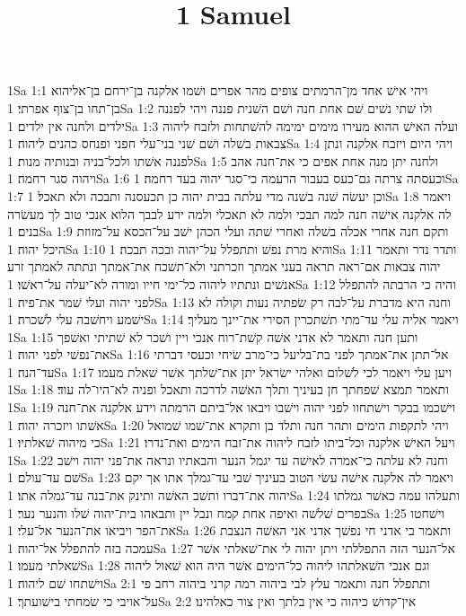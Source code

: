 

\title{1 Samuel}

1Sa 1:1  ויהי אישׁ אחד מן־הרמתים צופים מהר אפרים ושׁמו אלקנה בן־ירחם בן־אליהוא בן־תחו בן־צוף אפרתי׃
1Sa 1:2  ולו שׁתי נשׁים שׁם אחת חנה ושׁם השׁנית פננה ויהי לפננה ילדים ולחנה אין ילדים׃
1Sa 1:3  ועלה האישׁ ההוא מעירו מימים ימימה להשׁתחות ולזבח ליהוה צבאות בשׁלה ושׁם שׁני בני־עלי חפני ופנחס כהנים ליהוה׃
1Sa 1:4  ויהי היום ויזבח אלקנה ונתן לפננה אשׁתו ולכל־בניה ובנותיה מנות׃
1Sa 1:5  ולחנה יתן מנה אחת אפים כי את־חנה אהב ויהוה סגר רחמה׃
1Sa 1:6  וכעסתה צרתה גם־כעס בעבור הרעמה כי־סגר יהוה בעד רחמה׃
1Sa 1:7  וכן יעשׂה שׁנה בשׁנה מדי עלתה בבית יהוה כן תכעסנה ותבכה ולא תאכל׃
1Sa 1:8  ויאמר לה אלקנה אישׁה חנה למה תבכי ולמה לא תאכלי ולמה ירע לבבך הלוא אנכי טוב לך מעשׂרה בנים׃
1Sa 1:9  ותקם חנה אחרי אכלה בשׁלה ואחרי שׁתה ועלי הכהן ישׁב על־הכסא על־מזוזת היכל יהוה׃
1Sa 1:10  והיא מרת נפשׁ ותתפלל על־יהוה ובכה תבכה׃
1Sa 1:11  ותדר נדר ותאמר יהוה צבאות אם־ראה תראה בעני אמתך וזכרתני ולא־תשׁכח את־אמתך ונתתה לאמתך זרע אנשׁים ונתתיו ליהוה כל־ימי חייו ומורה לא־יעלה על־ראשׁו׃
1Sa 1:12  והיה כי הרבתה להתפלל לפני יהוה ועלי שׁמר את־פיה׃
1Sa 1:13  וחנה היא מדברת על־לבה רק שׂפתיה נעות וקולה לא ישׁמע ויחשׁבה עלי לשׁכרה׃
1Sa 1:14  ויאמר אליה עלי עד־מתי תשׁתכרין הסירי את־יינך מעליך׃
1Sa 1:15  ותען חנה ותאמר לא אדני אשׁה קשׁת־רוח אנכי ויין ושׁכר לא שׁתיתי ואשׁפך את־נפשׁי לפני יהוה׃
1Sa 1:16  אל־תתן את־אמתך לפני בת־בליעל כי־מרב שׂיחי וכעסי דברתי עד־הנה׃
1Sa 1:17  ויען עלי ויאמר לכי לשׁלום ואלהי ישׂראל יתן את־שׁלתך אשׁר שׁאלת מעמו׃
1Sa 1:18  ותאמר תמצא שׁפחתך חן בעיניך ותלך האשׁה לדרכה ותאכל ופניה לא־היו־לה עוד׃
1Sa 1:19  וישׁכמו בבקר וישׁתחוו לפני יהוה וישׁבו ויבאו אל־ביתם הרמתה וידע אלקנה את־חנה אשׁתו ויזכרה יהוה׃
1Sa 1:20  ויהי לתקפות הימים ותהר חנה ותלד בן ותקרא את־שׁמו שׁמואל כי מיהוה שׁאלתיו׃
1Sa 1:21  ויעל האישׁ אלקנה וכל־ביתו לזבח ליהוה את־זבח הימים ואת־נדרו׃
1Sa 1:22  וחנה לא עלתה כי־אמרה לאישׁה עד יגמל הנער והבאתיו ונראה את־פני יהוה וישׁב שׁם עד־עולם׃
1Sa 1:23  ויאמר לה אלקנה אישׁה עשׂי הטוב בעיניך שׁבי עד־גמלך אתו אך יקם יהוה את־דברו ותשׁב האשׁה ותינק את־בנה עד־גמלה אתו׃
1Sa 1:24  ותעלהו עמה כאשׁר גמלתו בפרים שׁלשׁה ואיפה אחת קמח ונבל יין ותבאהו בית־יהוה שׁלו והנער נער׃
1Sa 1:25  וישׁחטו את־הפר ויביאו את־הנער אל־עלי׃
1Sa 1:26  ותאמר בי אדני חי נפשׁך אדני אני האשׁה הנצבת עמכה בזה להתפלל אל־יהוה׃
1Sa 1:27  אל־הנער הזה התפללתי ויתן יהוה לי את־שׁאלתי אשׁר שׁאלתי מעמו׃
1Sa 1:28  וגם אנכי השׁאלתהו ליהוה כל־הימים אשׁר היה הוא שׁאול ליהוה וישׁתחו שׁם ליהוה׃
1Sa 2:1  ותתפלל חנה ותאמר עלץ לבי ביהוה רמה קרני ביהוה רחב פי על־אויבי כי שׂמחתי בישׁועתך׃
1Sa 2:2  אין־קדושׁ כיהוה כי אין בלתך ואין צור כאלהינו׃
